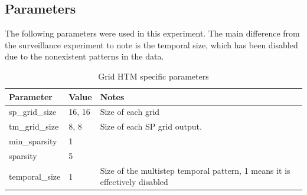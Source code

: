\subsection{Parameters}
The following parameters were used in this experiment. The main difference from the surveillance experiment to note is the temporal size, which has been disabled due to the nonexistent patterns in the data.
\begin{table}[H]
    \centering
    \begin{tabularx}{\linewidth}{@{}XlX@{}}
        \toprule
        \textbf{Parameter} & \textbf{Value} & \textbf{Notes}                                                             \\
        \midrule
        sp\_grid\_size     & 16, 16         & Size of each grid                                                          \\
        tm\_grid\_size     & 8, 8           & Size of each SP grid output.                                               \\
        min\_sparsity      & 1              &                                                                            \\
        sparsity           & 5              &                                                                            \\
        temporal\_size     & 1              & Size of the multistep temporal pattern, 1 means it is effectively disabled \\
        \bottomrule
    \end{tabularx}
    \caption{Grid HTM specific parameters}
    \label{tab:sperm_params}
\end{table}
